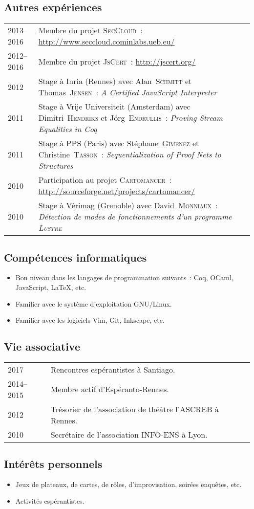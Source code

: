 \documentclass[12pt,a4paper]{article}
\makeatletter
\newcommand{\en}[1]{\foreignlanguage{english}{{#1}}}
\newcommand{\en}[1]{\foreignlanguage{english}{{#1}}}
\newenvironment{datecvsection}[1]%
               {\subsection*{#1}%
                 \noindent \begin{tabular}{@{}p{\annee}p{\texte}@{}}}
               {\end{tabular}}
\newenvironment{itemcvsection}[1]%
               {\subsection*{#1}\begin{itemize}}
               {\end{itemize}}
\newcommand\familyName{\textsc}
\newcommand\placeName{}
\makeatother
\begin{document}
\begin{datecvsection}{Autres expériences}

	2013–2016 & Membre du projet \textsc{SecCloud}~:  \url{http://www.seccloud.cominlabs.ueb.eu/} \\

	2012–2016 & Membre du projet \textsc{JsCert}~:  \url{http://jscert.org/} \\

    2012 & Stage à \placeName{Inria} (\placeName{Rennes}) avec Alan~\familyName{Schmitt} et Thomas~\familyName{Jensen}~:
	\en{\textit{A Certified JavaScript Interpreter}} \\

    2011 & Stage à \placeName{Vrĳe Universiteit} (\placeName{Amsterdam}) avec Dimitri~\familyName{Hendriks} et Jörg~\familyName{Endrullis}~:
	\en{\textit{Proving Stream Equalities in Coq}} \\

    2011 & Stage à \placeName{PPS} (\placeName{Paris}) avec Stéphane~\familyName{Gimenez} et Christine~\familyName{Tasson}~:
	\en{\textit{Sequentialization of Proof Nets to Structures}} \\

	2010 & Participation au projet \textsc{Cartomancer}~:  \url{http://sourceforge.net/projects/cartomancer/} \\

    2010 & Stage à \placeName{Vérimag} (\placeName{Grenoble}) avec David~\familyName{Monniaux}~:
	\textit{Détection de modes de fonctionnements d’un programme \textsc{Lustre}} \\

\end{datecvsection}

\begin{itemcvsection}{Compétences informatiques}

  \item Bon niveau dans les langages de programmation suivants~:  Coq, OCaml, JavaScript, \LaTeX, etc.
  \item Familier avec le système d’exploitation GNU/Linux.
  \item Familier avec les logiciels Vim, Git, Inkscape, etc.

\end{itemcvsection}

\begin{datecvsection}{Vie associative}

		2017 & Rencontres espérantistes à \placeName{Santiago}. \\
		2014–2015 & Membre actif d’{Espéranto-Rennes}. \\
		2012 & Trésorier de l’association de théâtre l’{ASCREB} à \placeName{Rennes}. \\
		2010 & Secrétaire de l’association \textsc{INFO-ENS} à \placeName{Lyon}. \\

\end{datecvsection}

\begin{itemcvsection}{Intérêts personnels}

  \item Jeux de plateaux, de cartes, de rôles, d’improvisation, soirées enquêtes, etc.
  \item Activités espérantistes.

\end{itemcvsection}
\end{document}

